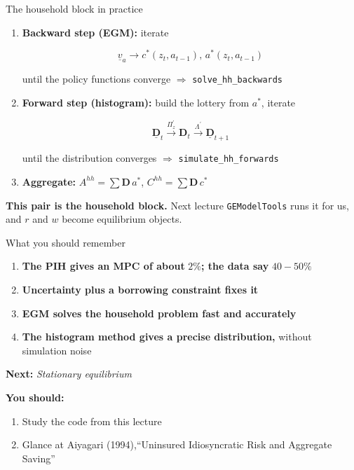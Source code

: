 \documentclass[
  10pt,
  ignorenonframetext,
  aspectratio=43,
  english,
]{beamer}
\providecommand{\tightlist}{%
  \setlength{\itemsep}{0pt}\setlength{\parskip}{0pt}}
\begin{document}
\begin{frame}[fragile]{The household block in practice}
\protect{}\label{the-household-block-in-practice}
\begin{enumerate}
\item
  \textbf{Backward step (EGM):} iterate\vspace{-1mm}

  \[
   \underline{v}_{a}\rightarrow c^{\ast}(z_{t},a_{t-1}),\,a^{\ast}(z_{t},a_{t-1})
   \]

  until the policy functions converge \(\Rightarrow\)
  \texttt{solve\_hh\_backwards}
\item
  \textbf{Forward step (histogram):} build the lottery from
  \(a^{\ast}\), iterate\vspace{-1mm}

  \[
   \underline{\boldsymbol{D}}_{t}\overset{\Pi^{\prime}_{z}}{\longrightarrow}\boldsymbol{D}_{t}\overset{\Lambda^{\prime}}{\longrightarrow}\underline{\boldsymbol{D}}_{t+1}
   \]

  until the distribution converges \(\Rightarrow\)
  \texttt{simulate\_hh\_forwards}
\item
  \textbf{Aggregate:} \(A^{hh}=\sum\boldsymbol{D}\,a^{\ast}\),
  \(C^{hh}=\sum\boldsymbol{D}\,c^{\ast}\)
\end{enumerate}

\vspace{2mm}

\textbf{This pair is the household block.} Next lecture
\texttt{GEModelTools} runs it for us, and \(r\) and \(w\) become
equilibrium objects.
\end{frame}

\begin{frame}{What you should remember}
\protect{}\label{what-you-should-remember}
\begin{enumerate}
\tightlist
\item
  \textbf{The PIH gives an MPC of about} \(2\%\)\textbf{; the data say}
  \(40-50\%\)
\item
  \textbf{Uncertainty plus a borrowing constraint fixes it}
\item
  \textbf{EGM solves the household problem fast and accurately}
\item
  \textbf{The histogram method gives a precise distribution,} without
  simulation noise
\end{enumerate}

\textbf{Next:} \emph{Stationary equilibrium}

\textbf{You should:}

\begin{enumerate}
\tightlist
\item
  Study the code from this lecture
\item
  Glance at Aiyagari (1994),``Uninsured Idiosyncratic Risk and Aggregate
  Saving''
\end{enumerate}
\end{frame}
\end{document}
